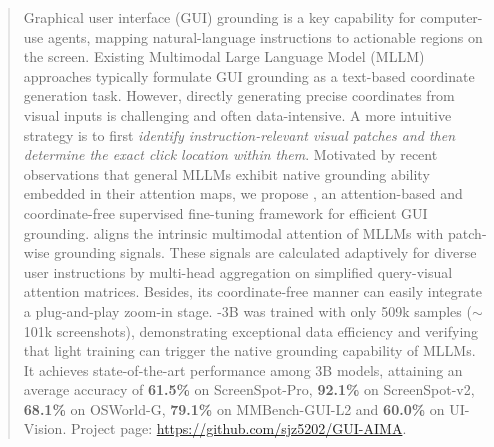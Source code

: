 \begin{abstract}
Graphical user interface (GUI) grounding is a key capability for computer-use agents, mapping natural-language instructions to actionable regions on the screen. Existing Multimodal Large Language Model (MLLM) approaches typically formulate GUI grounding as a text-based coordinate generation task. However, directly generating precise coordinates from visual inputs is challenging and often data-intensive.
A more intuitive strategy is to first \textit{identify instruction-relevant visual patches and then determine the exact click location within them}.
Motivated by recent observations that general MLLMs exhibit native grounding ability embedded in their attention maps,
we propose \method{},
an attention-based and coordinate-free supervised fine-tuning framework for efficient GUI grounding.
\method{} aligns the intrinsic multimodal attention of MLLMs with patch-wise grounding signals. These signals are calculated adaptively for diverse user instructions by multi-head aggregation on simplified query-visual attention matrices. Besides, its coordinate-free manner can easily integrate a plug-and-play zoom-in stage. \method{}-3B was trained with only 509k samples ($\sim$101k screenshots), demonstrating exceptional data efficiency and verifying that light training can trigger the native grounding capability of MLLMs. It achieves state-of-the-art performance among 3B models, attaining an average accuracy of \textbf{61.5\%} on ScreenSpot-Pro, \textbf{92.1\%} on ScreenSpot-v2, \textbf{68.1\%} on OSWorld-G, \textbf{79.1\%} on MMBench-GUI-L2 and \textbf{60.0\%} on UI-Vision.
Project page: \url{https://github.com/sjz5202/GUI-AIMA}.
\end{abstract}